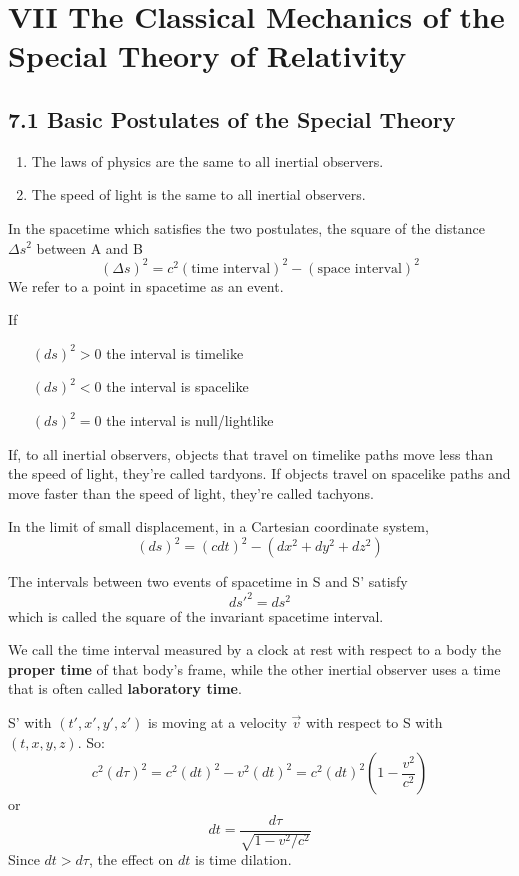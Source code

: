 \documentclass{article}
\begin{document}
	
	\section*{VII The Classical Mechanics of the Special Theory of Relativity}
	
	\subsection*{7.1 Basic Postulates of the Special Theory}
	\begin{enumerate}
		\item The laws of physics are the same to all inertial observers.
		\item The speed of light is the same to all inertial observers.
	\end{enumerate}
	
	In the spacetime which satisfies the two postulates, the square of the distance $\Delta s^2$ between A and B
	\[ (\Delta s)^2 = c^2(\text{time interval})^2 - (\text{space interval})^2 \]
	We refer to a point in spacetime as an event.
	
	If
	\begin{itemize}
		\item[$(ds)^2 > 0$] the interval is timelike
		\item[$(ds)^2 < 0$] the interval is spacelike
		\item[$(ds)^2 = 0$] the interval is null/lightlike
	\end{itemize}
	
	If, to all inertial observers, objects that travel on timelike paths move less than the speed of light, they're called tardyons.
	If objects travel on spacelike paths and move faster than the speed of light, they're called tachyons.
	
	In the limit of small displacement, in a Cartesian coordinate system,
	\[ (ds)^2 = (cdt)^2 - (dx^2 + dy^2 + dz^2) \]
	
	The intervals between two events of spacetime in S and S' satisfy
	\[ ds'^2 = ds^2 \]
	which is called the square of the invariant spacetime interval.
	
	We call the time interval measured by a clock at rest with respect to a body the \textbf{proper time} of that body's frame, while the other inertial observer uses a time that is often called \textbf{laboratory time}.
	
	S' with $(t', x', y', z')$ is moving at a velocity $\vec{v}$ with respect to S with $(t, x, y, z)$.
	So:
	\[ c^2(d\tau)^2 = c^2(dt)^2 - v^2(dt)^2 = c^2(dt)^2(1 - \frac{v^2}{c^2}) \]
	or
	\[ dt = \frac{d\tau}{\sqrt{1 - v^2/c^2}} \]
	Since $dt > d\tau$, the effect on $dt$ is time dilation.
	
\end{document}
